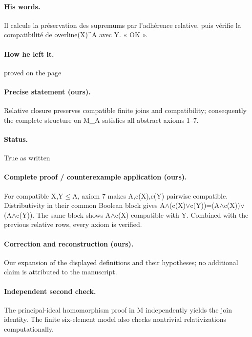 \paragraph{His words.} Il calcule la préservation des supremums par l’adhérence relative, puis vérifie la compatibilité de overline(X)\textasciicircum{}A avec Y. « OK ».

\paragraph{How he left it.} proved on the page

\paragraph{Precise statement (ours).} Relative closure preserves compatible finite joins and compatibility; consequently the complete structure on M\_A satisfies all abstract axioms 1–7.

\paragraph{Status.} True as written

\paragraph{Complete proof / counterexample application (ours).} For compatible X,Y\ensuremath{\leq}A, axiom 7 makes A,c(X),c(Y) pairwise compatible. Distributivity in their common Boolean block gives A\ensuremath{\wedge}(c(X)\ensuremath{\vee}c(Y))=(A\ensuremath{\wedge}c(X))\ensuremath{\vee}(A\ensuremath{\wedge}c(Y)). The same block shows A\ensuremath{\wedge}c(X) compatible with Y. Combined with the previous relative rows, every axiom is verified.

\paragraph{Correction and reconstruction (ours).} Our expansion of the displayed definitions and their hypotheses; no additional claim is attributed to the manuscript.

\paragraph{Independent second check.} The principal-ideal homomorphism proof in M independently yields the join identity. The finite six-element model also checks nontrivial relativizations computationally.

